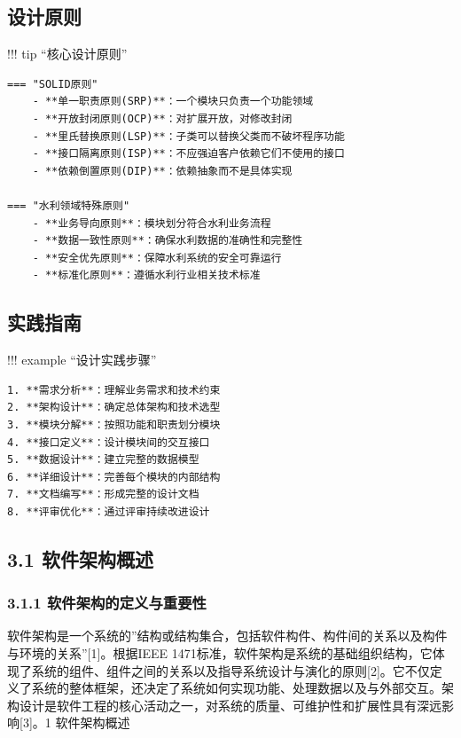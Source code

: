 \subsection{设计原则}\label{ux8bbeux8ba1ux539fux5219}

!!! tip ``核心设计原则''

\begin{verbatim}
=== "SOLID原则"
    - **单一职责原则(SRP)**：一个模块只负责一个功能领域
    - **开放封闭原则(OCP)**：对扩展开放，对修改封闭
    - **里氏替换原则(LSP)**：子类可以替换父类而不破坏程序功能
    - **接口隔离原则(ISP)**：不应强迫客户依赖它们不使用的接口
    - **依赖倒置原则(DIP)**：依赖抽象而不是具体实现
    
=== "水利领域特殊原则"
    - **业务导向原则**：模块划分符合水利业务流程
    - **数据一致性原则**：确保水利数据的准确性和完整性
    - **安全优先原则**：保障水利系统的安全可靠运行
    - **标准化原则**：遵循水利行业相关技术标准
\end{verbatim}

\subsection{实践指南}\label{ux5b9eux8df5ux6307ux5357}

!!! example ``设计实践步骤''

\begin{verbatim}
1. **需求分析**：理解业务需求和技术约束
2. **架构设计**：确定总体架构和技术选型
3. **模块分解**：按照功能和职责划分模块
4. **接口定义**：设计模块间的交互接口
5. **数据设计**：建立完整的数据模型
6. **详细设计**：完善每个模块的内部结构
7. **文档编写**：形成完整的设计文档
8. **评审优化**：通过评审持续改进设计
\end{verbatim}

\subsection{3.1 软件架构概述}\label{ux8f6fux4ef6ux67b6ux6784ux6982ux8ff0}

\subsubsection{3.1.1 软件架构的定义与重要性}\label{ux8f6fux4ef6ux67b6ux6784ux7684ux5b9aux4e49ux4e0eux91cdux8981ux6027}

软件架构是一个系统的''结构或结构集合，包括软件构件、构件间的关系以及构件与环境的关系''{[}1{]}。根据IEEE 1471标准，软件架构是系统的基础组织结构，它体现了系统的组件、组件之间的关系以及指导系统设计与演化的原则{[}2{]}。它不仅定义了系统的整体框架，还决定了系统如何实现功能、处理数据以及与外部交互。架构设计是软件工程的核心活动之一，对系统的质量、可维护性和扩展性具有深远影响{[}3{]}。1 软件架构概述

